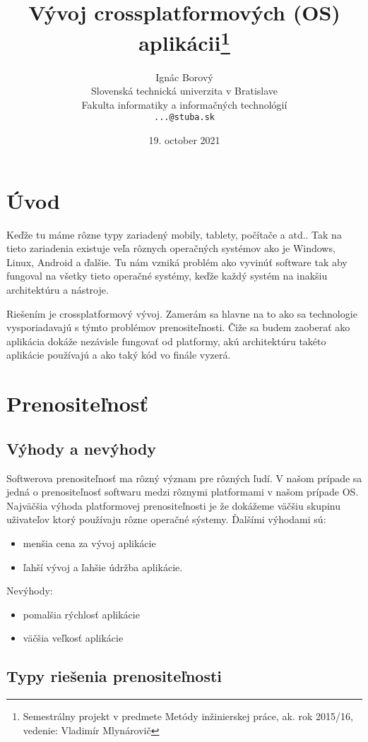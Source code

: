 \documentclass[10pt,twoside,slovak,a4paper]{article}
\title{Vývoj crossplatformových (OS) aplikácii\thanks{Semestrálny projekt v predmete Metódy inžinierskej práce, ak. rok 2015/16, vedenie: Vladimír Mlynárovič}}
\author{Ignác Borový\\[2pt]
	{\small Slovenská technická univerzita v Bratislave}\\
	{\small Fakulta informatiky a informačných technológií}\\
	{\small \texttt{...@stuba.sk}}
	}
\date{\small 19. october 2021}
\begin{document}
\maketitle


\section{Úvod}
\quad
Keďže tu máme rôzne typy zariadený mobily, tablety, počítače a atd.. Tak na tieto zariadenia existuje veľa rôznych operačných systémov ako je Windows, Linux, Android a ďalšie. Tu nám vzniká problém ako vyvinúť software tak aby fungoval na všetky tieto operačné systémy, keďže každý systém na inakšiu architektúru a nástroje. 

Riešením je crossplatformový vývoj. Zamerám sa hlavne na to ako sa technologie vysporiadavajú s týmto problémov prenositeľnosti. Čiže sa budem zaoberať ako aplikácia dokáže nezávisle fungovať od platformy, akú architektúru takéto aplikácie používajú a ako taký kód vo finále vyzerá.

\section{Prenositeľnosť}
\subsection{Výhody a nevýhody}

\quad
Softwerova prenositeľnosť ma rôzný význam pre rôzných ľudí. V našom prípade sa jedná o prenositeľnosť softwaru medzi rôznymi platformami v našom prípade OS. Najväčšia výhoda platformovej prenositeľnosti je že dokážeme väčšiu skupinu uživateľov ktorý používaju rôzne operačné sýstemy. 
Ďalšími výhodami sú:
\begin{itemize}
    \item menšia cena za vývoj aplikácie
    \item ľahší vývoj a ľahšie údržba aplikácie.
\end{itemize}
Nevýhody:
\begin{itemize}
    \item pomalšia rýchlosť aplikácie
    \item väčšia veľkosť aplikácie
\end{itemize}

\subsection{Typy riešenia prenositeľnosti}
\end{document}
